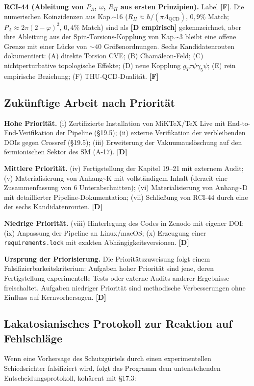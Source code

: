﻿\documentclass[11pt,letterpaper]{article}
\begin{document}
\textbf{RCI-44 (Ableitung von $P_\Lambda$, $\omega$, $R_H$ aus ersten Prinzipien).} Label \textbf{[F]}. Die numerischen Koinzidenzen aus Kap.\textasciitilde{}16 ($R_H \approx \hbar/(\pi\Lambda_{\text{QCD}})$, $0{,}9\%$ Match; $P_\Lambda \approx 2\pi(2-\varphi)^2$, $0{,}4\%$ Match) sind als \textbf{[D empirisch]} gekennzeichnet, aber ihre Ableitung aus der Spin-Torsions-Kopplung von Kap.\textasciitilde{}3 bleibt eine offene Grenze mit einer Lücke von $\sim 40$ Größenordnungen. Sechs Kandidatenrouten dokumentiert: (A) direkte Torsion CVE; (B) Chamäleon-Feld; (C) nichtperturbative topologische Effekte; (D) neue Kopplung $g_T \tau\bar{\psi}\gamma_5\psi$; (E) rein empirische Beziehung; (F) THU-QCD-Dualität. \textbf{[F]}
\subsection{Zukünftige Arbeit nach Priorität}
\textbf{Hohe Priorität.} (i) Zertifizierte Installation von MiKTeX/TeX Live mit End-to-End-Verifikation der Pipeline (§19.5); (ii) externe Verifikation der verbleibenden DOIs gegen Crossref (§19.5); (iii) Erweiterung der Vakuumauslöschung auf den fermionischen Sektor des SM (A-17). \textbf{[D]}

\textbf{Mittlere Priorität.} (iv) Fertigstellung der Kapitel 19--21 mit externem Audit; (v) Materialisierung von Anhang\textasciitilde{}K mit vollständigem Inhalt (derzeit eine Zusammenfassung von 6 Unterabschnitten); (vi) Materialisierung von Anhang\textasciitilde{}D mit detaillierter Pipeline-Dokumentation; (vii) Schließung von RCI-44 durch eine der sechs Kandidatenrouten. \textbf{[D]}

\textbf{Niedrige Priorität.} (viii) Hinterlegung des Codes in Zenodo mit eigener DOI; (ix) Anpassung der Pipeline an Linux/macOS; (x) Erzeugung einer \texttt{requirements.lock} mit exakten Abhängigkeitsversionen. \textbf{[D]}

\textbf{Ursprung der Priorisierung.} Die Prioritätszuweisung folgt einem Falsifizierbarkeitskriterium: Aufgaben hoher Priorität sind jene, deren Fertigstellung experimentelle Tests oder externe Audits anderer Ergebnisse freischaltet. Aufgaben niedriger Priorität sind methodische Verbesserungen ohne Einfluss auf Kernvorhersagen. \textbf{[D]}
\subsection{Lakatosianisches Protokoll zur Reaktion auf Fehlschläge}
Wenn eine Vorhersage des Schutzgürtels durch einen experimentellen Schiedsrichter falsifiziert wird, folgt das Programm dem untenstehenden Entscheidungsprotokoll, kohärent mit §17.3:
\end{document}
